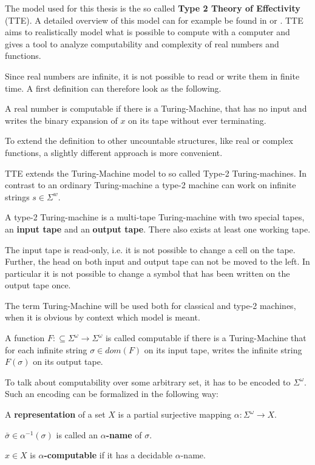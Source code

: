 The model used for this thesis is the so called \textbf{Type 2 Theory of Effectivity}
(TTE). 
A detailed overview of this model can for example be found in \cite{Wei} or
\cite{Brattka2008a}.
TTE aims to realistically model what is possible to compute with a
computer and gives a tool to analyze computability and complexity of real
numbers and functions.

Since real numbers are infinite, it is not possible to read or write them in
finite time.
A first definition can therefore look as the following.
\begin{definition}\label{def:computable real1}
 A real number is computable if there is a Turing-Machine, that has no input
 and writes the binary expansion of $x$ on its tape without ever terminating.
\end{definition}
To extend the definition to other uncountable structures, like real or complex
functions, a slightly different approach is more convenient.

TTE extends the Turing-Machine model to so called Type-2 Turing-machines.
In contrast to an ordinary Turing-machine a type-2 machine can work on infinite strings $s \in \Sigma^w$. 
\begin{definition}
A type-2 Turing-machine is a multi-tape Turing-machine with two special tapes,
an \textbf{input tape} and an \textbf{output tape}.
There also exists at least one working tape. 

The input tape is read-only, i.e. it is not possible to change a cell on the
tape. 
Further, the head on both input and output tape can not be moved to the
left. 
In particular it is not possible to change a symbol that has been written
on the output tape once. 
\end{definition}
The term Turing-Machine will be used both for classical and type-2
machines, when it is obvious by context which model is meant.
\begin{definition}\label{def:computability_ttt}
A function $F:\subseteq \Sigma^\omega \to \Sigma^\omega$ is called computable if there is a Turing-Machine  
that for each infinite string $\sigma \in dom(F)$ on its input tape, writes the infinite string $F(\sigma)$ on its output tape. 
\end{definition}
To talk about computability over some arbitrary set, it has to be encoded to
$\Sigma^\omega$. 
Such an encoding can be formalized in the following way:
\begin{definition}\label{def:representation}
	A \textbf{representation} of a set $X$ is a partial surjective mapping $\alpha: \Sigma^\omega \to X$. 

	$\bar \sigma \in \alpha^{-1}(\sigma)$ is called an \textbf{$\alpha$-name} of $\sigma$. 

	$x \in X$ is \textbf{$\alpha$-computable} if it has a decidable $\alpha$-name.
\end{definition}

